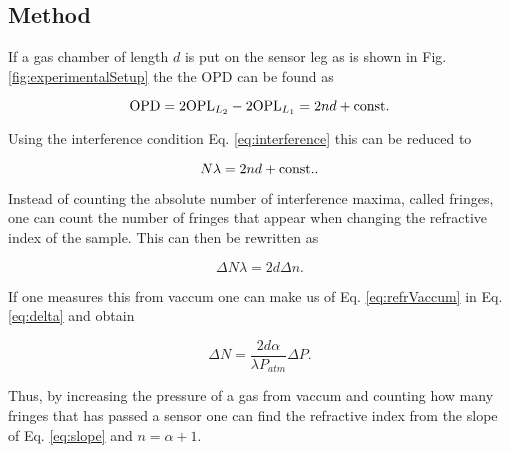 \subsection{Method}

If a gas chamber of length $d$ is put on the sensor leg as is shown in Fig. \ref{fig:experimentalSetup} the the OPD can be found as

\begin{equation}
  \label{eq:OPD}
  \textnormal{OPD} = 2\textnormal{OPL}_{L_2} - 2\textnormal{OPL}_{L_1} = 2nd + \textnormal{const.}
\end{equation}

Using the interference condition Eq. \eqref{eq:interference} this can be reduced to

\begin{equation*}
  N \lambda = 2nd + \textnormal{const.}.
\end{equation*}

Instead of counting the absolute number of interference maxima, called fringes, one can count the number of fringes that appear when changing the refractive index of the sample. This can then be rewritten as

\begin{equation}
\label{eq:delta}
  \Delta N \lambda = 2d \Delta n.
\end{equation}

If one measures this from vaccum one can make us of Eq. \eqref{eq:refrVaccum} in Eq. \eqref{eq:delta} and obtain

\begin{equation}
\label{eq:slope}
  \Delta N = \frac{2d\alpha}{\lambda P_{atm}} \Delta P.
\end{equation}

Thus, by increasing the pressure of a gas from vaccum and counting how many fringes that has passed a sensor one can find the refractive index from the slope of Eq. \eqref{eq:slope} and $n=\alpha+1$.
